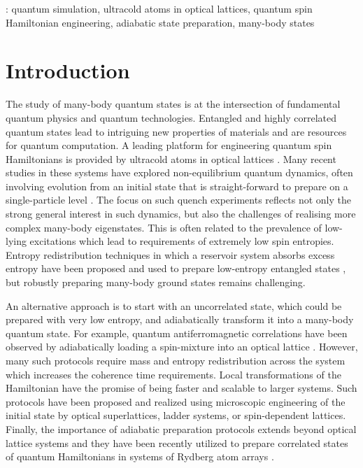 \documentclass[12pt]{iopart}
\begin{document}
: quantum simulation, ultracold atoms in optical lattices, quantum spin Hamiltonian engineering, adiabatic state preparation, many-body states

\maketitle

\section{Introduction}
The study of many-body quantum states is at the intersection of fundamental quantum physics and quantum technologies. Entangled and highly correlated quantum states lead to intriguing new properties of materials and are resources for quantum computation. A leading platform for engineering quantum spin Hamiltonians is provided by ultracold atoms in optical lattices \cite{bloch08}. Many recent studies in these systems have explored non-equilibrium quantum dynamics, often involving evolution from an initial state that is straight-forward to prepare on a single-particle level \cite{choi16, matt19, rispoli19, sanchez20, nature20, scherg21, wei22, oppong22}. The focus on such quench experiments reflects not only the strong general interest in such dynamics, but also the challenges of realising more complex many-body eigenstates. This is often related to the prevalence of low-lying excitations which lead to requirements of extremely low spin entropies. Entropy redistribution techniques in which a reservoir system absorbs excess entropy have been proposed \cite{bernier09, kantian18, zaletel21} and used to prepare low-entropy entangled states \cite{chiu18, yang20}, but robustly preparing many-body ground states remains challenging. 

An alternative approach is to start with an uncorrelated state, which could be prepared with very low entropy, and adiabatically transform it into a many-body quantum state. For example, quantum antiferromagnetic correlations have been observed by adiabatically loading a spin-mixture into an optical lattice \cite{boll16, parsons16, cheuk16, mitra18}. However, many such protocols require mass and entropy redistribution across the system which increases the coherence time requirements. Local transformations of the Hamiltonian have the promise of being faster and scalable to larger systems. Such protocols have been proposed \cite{rabl03, sorenson10, lubasch11, schachenmayer15, wei22} and realized \cite{pan21, sompet22} using microscopic engineering of the initial state by optical superlattices, ladder systems, or spin-dependent lattices. Finally, the importance of adiabatic preparation protocols extends beyond optical lattice systems and they have been recently utilized to prepare correlated states of quantum Hamiltonians in systems of Rydberg atom arrays \cite{ebadi21, semeghini21, ebadi22, chen22}. 
\end{document}
